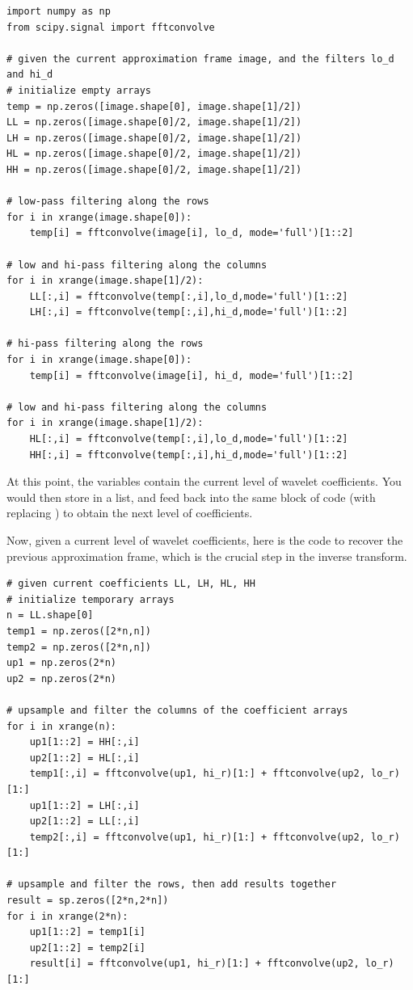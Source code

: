 \begin{lstlisting}
import numpy as np
from scipy.signal import fftconvolve

# given the current approximation frame image, and the filters lo_d and hi_d
# initialize empty arrays
temp = np.zeros([image.shape[0], image.shape[1]/2])
LL = np.zeros([image.shape[0]/2, image.shape[1]/2])
LH = np.zeros([image.shape[0]/2, image.shape[1]/2])
HL = np.zeros([image.shape[0]/2, image.shape[1]/2])
HH = np.zeros([image.shape[0]/2, image.shape[1]/2])

# low-pass filtering along the rows
for i in xrange(image.shape[0]):
	temp[i] = fftconvolve(image[i], lo_d, mode='full')[1::2]

# low and hi-pass filtering along the columns
for i in xrange(image.shape[1]/2):
	LL[:,i] = fftconvolve(temp[:,i],lo_d,mode='full')[1::2]
    LH[:,i] = fftconvolve(temp[:,i],hi_d,mode='full')[1::2]

# hi-pass filtering along the rows
for i in xrange(image.shape[0]):
	temp[i] = fftconvolve(image[i], hi_d, mode='full')[1::2]

# low and hi-pass filtering along the columns
for i in xrange(image.shape[1]/2):
	HL[:,i] = fftconvolve(temp[:,i],lo_d,mode='full')[1::2]
    HH[:,i] = fftconvolve(temp[:,i],hi_d,mode='full')[1::2]
\end{lstlisting}
At this point, the variables  contain the current level of wavelet coefficients.
You would then store  in a list, and feed  back into the same
block of code (with  replacing ) to obtain the next level of coefficients.

Now, given a current level of wavelet coefficients, here is the code to recover the previous
approximation frame, which is the crucial step in the inverse transform.
\begin{lstlisting}
# given current coefficients LL, LH, HL, HH
# initialize temporary arrays
n = LL.shape[0]
temp1 = np.zeros([2*n,n])
temp2 = np.zeros([2*n,n])
up1 = np.zeros(2*n)
up2 = np.zeros(2*n)

# upsample and filter the columns of the coefficient arrays
for i in xrange(n):
	up1[1::2] = HH[:,i]
	up2[1::2] = HL[:,i]
	temp1[:,i] = fftconvolve(up1, hi_r)[1:] + fftconvolve(up2, lo_r)[1:]
	up1[1::2] = LH[:,i]
	up2[1::2] = LL[:,i]		
	temp2[:,i] = fftconvolve(up1, hi_r)[1:] + fftconvolve(up2, lo_r)[1:]

# upsample and filter the rows, then add results together
result = sp.zeros([2*n,2*n])
for i in xrange(2*n):
	up1[1::2] = temp1[i]
	up2[1::2] = temp2[i]
	result[i] = fftconvolve(up1, hi_r)[1:] + fftconvolve(up2, lo_r)[1:]
\end{lstlisting}

